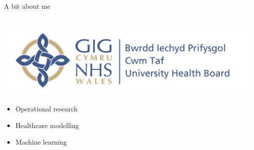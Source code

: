 \documentclass{beamer}
\begin{document}
\begin{frame}{A bit about me}
\begin{columns}[T]
\begin{column}{.5\textwidth}
            \vspace{10pt}
            \includegraphics[width=\linewidth]{cthb_logo.jpg}\\
            \vspace{5pt}

            \begin{itemize}
                \item Operational research
                \item Healthcare modelling
                \item Machine learning
            \end{itemize}
        \end{column}
    \end{columns}

\end{frame}
\end{document}
